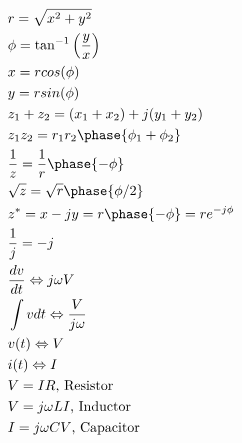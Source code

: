 \documentclass[10pt,letterpaper]{report}
\begin{document}
\begin{equation*}
\begin{split}
	& r = \sqrt{x^2 + y^2} \\
	& \phi = \tan^{-1}\left(\frac{y}{x}\right) \\
	&x = r cos (\phi) \\
	&y = r sin (\phi) \\
	&z_1 + z_2 = (x_1 + x_2 ) + j (y_1 + y_2 ) \\
	&z_1 z_2 = r_1r_2 \phase{\phi_1 + \phi_2} \\
	&\frac{1}{z} = \frac{1}{r} \phase{-\phi} \\
	&\sqrt{z} = \sqrt{r}\phase{\phi/2} \\
	&z^* = x - jy = r \phase{-\phi} = re^{-j \phi} \\
	&\frac{1}{j} = -j \\
	& \frac{dv}{dt} \Leftrightarrow j\omega V \\
	& \int vdt \Leftrightarrow \frac{V}{j \omega} \\
	& v(t) \Leftrightarrow V \\
	& i(t) \Leftrightarrow I \\
	& V = IR \text{, Resistor}\\
	& V = j \omega LI \text{, Inductor} \\
	& I = j\omega CV\text{, Capacitor}
\end{split}
\end{equation*}
\end{document}
